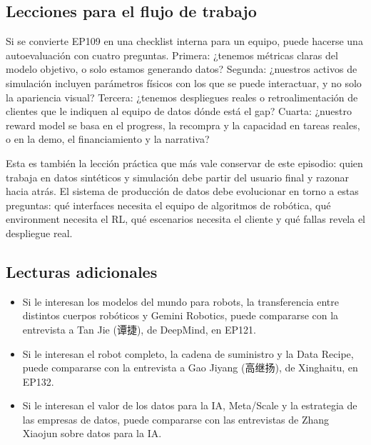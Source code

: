 \documentclass[a4paper]{article}
\begin{document}
\subsection{Lecciones para el flujo de trabajo}

Si se convierte EP109 en una checklist interna para un equipo, puede hacerse una autoevaluación con cuatro preguntas. Primera: ¿tenemos métricas claras del modelo objetivo, o solo estamos generando datos? Segunda: ¿nuestros activos de simulación incluyen parámetros físicos con los que se puede interactuar, y no solo la apariencia visual? Tercera: ¿tenemos despliegues reales o retroalimentación de clientes que le indiquen al equipo de datos dónde está el gap? Cuarta: ¿nuestro reward model se basa en el progress, la recompra y la capacidad en tareas reales, o en la demo, el financiamiento y la narrativa?

Esta es también la lección práctica que más vale conservar de este episodio: quien trabaja en datos sintéticos y simulación debe partir del usuario final y razonar hacia atrás. El sistema de producción de datos debe evolucionar en torno a estas preguntas: qué interfaces necesita el equipo de algoritmos de robótica, qué environment necesita el RL, qué escenarios necesita el cliente y qué fallas revela el despliegue real.

\subsection{Lecturas adicionales}

\begin{itemize}
\item Si le interesan los modelos del mundo para robots, la transferencia entre distintos cuerpos robóticos y Gemini Robotics, puede compararse con la entrevista a Tan Jie (谭捷), de DeepMind, en EP121.
\item Si le interesan el robot completo, la cadena de suministro y la Data Recipe, puede compararse con la entrevista a Gao Jiyang (高继扬), de Xinghaitu, en EP132.
\item Si le interesan el valor de los datos para la IA, Meta/Scale y la estrategia de las empresas de datos, puede compararse con las entrevistas de Zhang Xiaojun sobre datos para la IA.
\end{itemize}
\end{document}
